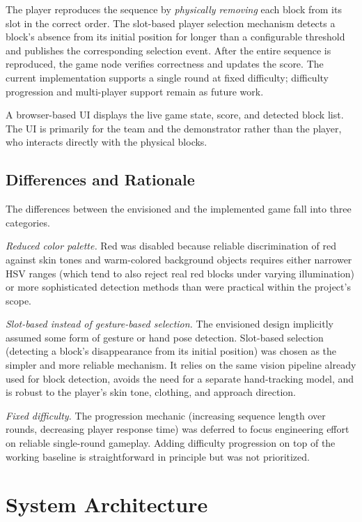 \documentclass[conference]{IEEEtran}
\begin{document}
The player reproduces the sequence by \emph{physically removing} each
block from its slot in the correct order. The slot-based player
selection mechanism detects a block's absence from its initial
position for longer than a configurable threshold and publishes the
corresponding selection event. After the entire sequence is reproduced,
the game node verifies correctness and updates the score. The current
implementation supports a single round at fixed difficulty; difficulty
progression and multi-player support remain as future work.

A browser-based UI displays the live game state, score, and detected
block list. The UI is primarily for the team and the demonstrator
rather than the player, who interacts directly with the physical
blocks.

\subsection{Differences and Rationale}

The differences between the envisioned and the implemented game fall
into three categories.

\textit{Reduced color palette.} Red was disabled because reliable
discrimination of red against skin tones and warm-colored background
objects requires either narrower HSV ranges (which tend to also reject
real red blocks under varying illumination) or more sophisticated
detection methods than were practical within the project's scope.

\textit{Slot-based instead of gesture-based selection.} The envisioned
design implicitly assumed some form of gesture or hand pose detection.
Slot-based selection (detecting a block's disappearance from its initial
position) was chosen as the simpler and more reliable mechanism. It
relies on the same vision pipeline already used for block detection,
avoids the need for a separate hand-tracking model, and is robust to
the player's skin tone, clothing, and approach direction.

\textit{Fixed difficulty.} The progression mechanic (increasing sequence
length over rounds, decreasing player response time) was deferred to
focus engineering effort on reliable single-round gameplay. Adding
difficulty progression on top of the working baseline is straightforward
in principle but was not prioritized.

\section{System Architecture}
\label{sec:arch}
\end{document}
